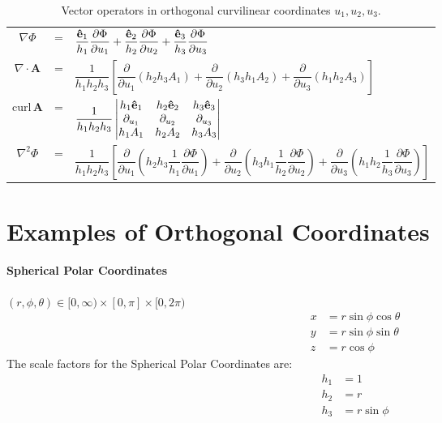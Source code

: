 \begin{table}[h!]
 \begin{tabular}{ccl}
  \hline \rule{0pt}{4ex}    
  $\nabla \Phi$& =&$ \displaystyle\dfrac{\mathbf{\hat e}_1}{h_1}\dfrac{\partial \Phi}{\partial u_1} + \dfrac{\mathbf{\hat e}_2}{h_2}\dfrac{\partial \Phi}{\partial u_2} + \dfrac{\mathbf{\hat e}_3}{h_3}\dfrac{\partial \Phi}{\partial u_3}$\\
$ \nabla \cdot \mathbf A$& =&$  \displaystyle\dfrac{1}{h_1h_2h_3}\left[\dfrac{\partial }{\partial u_1}(h_2h_3 A_1) + \dfrac{\partial }{\partial u_2}(h_3h_1 A_2) + \dfrac{\partial }{\partial u_3}(h_1h_2A_3)\right]$\\
$\mathrm{curl}\,\mathbf A$& =& $   \displaystyle\dfrac{1}{h_1h_2h_3}
  \begin{vmatrix}
  h_1\mathbf{\hat e}_1 & h_2 \mathbf{\hat e}_2 & h_3\mathbf{\hat e}_3\\
  \partial _{u_1} &\partial _{u_2} &\partial _{u_3}\\
  h_1A_1 & h_2A_2 & h_3A_3
  \end{vmatrix}$\\
  $\nabla^2\Phi$  &=& $ \displaystyle\dfrac{1}{h_1h_2h_3}\left[\dfrac{\partial }{\partial u_1}(h_2h_3\dfrac{1}{h_1}\dfrac{\partial \Phi}{\partial u_1}) + \dfrac{\partial }{\partial u_2}(h_3h_1\dfrac{1}{h_2}\dfrac{\partial \Phi}{\partial u_2}) + \dfrac{\partial }{\partial u_3}(h_1h_2\dfrac{1}{h_3}\dfrac{\partial \Phi}{\partial u_3})\right]$   \rule{0pt}{4ex}  \\
   \hline 
 \end{tabular}
\caption{Vector operators in orthogonal curvilinear coordinates $u_ 1 , u_ 2 , u_ 3.$}
\end{table}

\section{Examples of  Orthogonal Coordinates}

\paragraph{Spherical Polar Coordinates} 
\((r, \phi, \theta)\in[0,\infty)\times[0,\pi]\times[0,2\pi)\) 
\begin{align}
x&=r\sin\phi\cos\theta \\
y&=r\sin\phi\sin\theta \\
z&=r\cos\phi
\end{align}
The scale factors for the Spherical Polar Coordinates are:
\begin{align}
h_1&=1 \\
h_2&=r \\
h_3&=r\sin\phi
\end{align}
